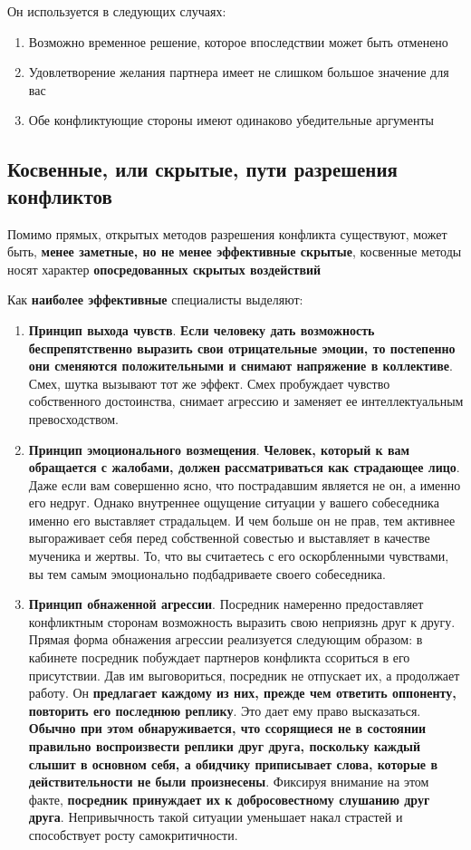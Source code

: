 \documentclass[a4paper,14pt]{extarticle}
\begin{document}
\begin{enumerate}
    Он используется в следующих случаях:
    \begin{enumerate}
        \item Возможно временное решение, которое впоследствии может быть отменено
        \item Удовлетворение желания партнера имеет не слишком большое значение для вас
        \item Обе конфликтующие стороны имеют одинаково убедительные аргументы
    \end{enumerate}
\end{enumerate}

\subsection{Косвенные, или скрытые, пути разрешения конфликтов}

Помимо прямых, открытых методов разрешения конфликта существуют, может быть, \textbf{менее заметные, но не менее эффективные скрытые}, косвенные методы носят характер \textbf{опосредованных скрытых воздействий}

Как \textbf{наиболее эффективные} специалисты выделяют:

\begin{enumerate}
    \item \textbf{Принцип выхода чувств}. \textbf{Если человеку дать возможность беспрепятственно выразить свои отрицательные эмоции, то постепенно они сменяются положительными и снимают напряжение в коллективе}. Смех, шутка вызывают тот же эффект. Смех пробуждает чувство собственного достоинства, снимает агрессию и заменяет ее интеллектуальным превосходством.
    \item \textbf{Принцип эмоционального возмещения}. \textbf{Человек, который к вам обращается с жалобами, должен рассматриваться как страдающее лицо}. Даже если вам совершенно ясно, что пострадавшим является не он, а именно его недруг. Однако внутреннее ощущение ситуации у вашего собеседника именно его выставляет страдальцем. И чем больше он не прав, тем активнее выгораживает себя перед собственной совестью и выставляет в качестве мученика и жертвы. То, что вы считаетесь с его оскорбленными чувствами, вы тем самым эмоционально подбадриваете своего собеседника.
    \item \textbf{Принцип обнаженной агрессии}. Посредник намеренно предоставляет конфликтным сторонам возможность выразить свою неприязнь друг к другу. Прямая форма обнажения агрессии реализуется следующим образом: в кабинете посредник побуждает партнеров конфликта ссориться в его присутствии. Дав им выговориться, посредник не отпускает их, а продолжает работу. Он \textbf{предлагает каждому из них, прежде чем ответить оппоненту, повторить его последнюю реплику}. Это дает ему право высказаться. \textbf{Обычно при этом обнаруживается, что ссорящиеся не в состоянии правильно воспроизвести реплики друг друга, поскольку каждый слышит в основном себя, а обидчику приписывает слова, которые в действительности не были произнесены}. Фиксируя внимание на этом факте, \textbf{посредник принуждает их к добросовестному слушанию друг друга}. Непривычность такой ситуации уменьшает накал страстей и способствует росту самокритичности.
\end{enumerate}
\end{document}
